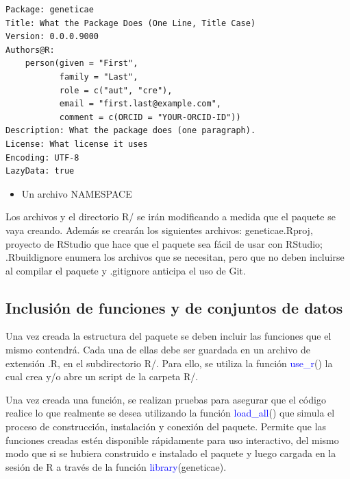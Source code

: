 \begin{verbatim}
Package: geneticae
Title: What the Package Does (One Line, Title Case)
Version: 0.0.0.9000
Authors@R: 
    person(given = "First",
           family = "Last",
           role = c("aut", "cre"),
           email = "first.last@example.com",
           comment = c(ORCID = "YOUR-ORCID-ID"))
Description: What the package does (one paragraph).
License: What license it uses
Encoding: UTF-8
LazyData: true
\end{verbatim}




\begin{itemize}
\item Un archivo NAMESPACE
\end{itemize}

Los archivos y el directorio R/ se irán modificando a medida que el paquete se vaya creando. Además se crearán los siguientes archivos: geneticae.Rproj, proyecto de RStudio que hace que el paquete sea fácil de usar con RStudio; .Rbuildignore enumera los archivos que se necesitan, pero que no deben incluirse al compilar el paquete y .gitignore anticipa el uso de Git.




\subsection{Inclusión de funciones y de conjuntos de datos}

Una vez creada la estructura del paquete se deben incluir las funciones que el mismo contendrá. Cada una de ellas debe ser guardada en un archivo de extensión .R, en el subdirectorio R/. Para ello, se utiliza la función \textcolor{blue}{use\_r}() la cual crea y/o abre un script de la carpeta R/.

Una vez creada una función, se realizan pruebas para asegurar que el código realice lo que realmente se desea utilizando la función \textcolor{blue}{load\_all}() que simula el proceso de construcción, instalación y conexión del paquete. Permite que las funciones creadas estén disponible rápidamente para uso interactivo, del mismo modo que si se hubiera construido e instalado el paquete y luego cargada en la sesión de R a través de la función \textcolor{blue}{library}(geneticae).

